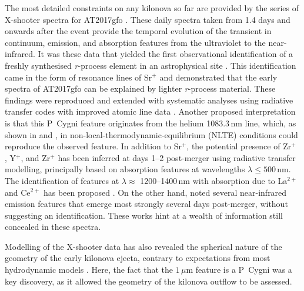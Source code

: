 \documentclass{aa}
\newcommand{\rproc}{\textit{r}-process\xspace}
\begin{document}
The most detailed constraints on any kilonova so far are provided by the series of X-shooter spectra for AT2017gfo \citep{Smartt2017,Pian2017}. These daily spectra taken from 1.4 days and onwards after the event provide the temporal evolution of the transient in continuum, emission, and absorption features from the ultraviolet to the near-infrared. It was these data that yielded the first observational identification of a freshly synthesised \rproc element in an astrophysical site \citep{Watson2019}. This identification came in the form of resonance lines of Sr\(^+\) and demonstrated that the early spectra of AT2017gfo can be explained by lighter \rproc material. These findings were reproduced and extended with systematic analyses using radiative transfer codes with improved atomic line data \citep{Domoto2021,Gillanders2022,Vieira2023}. Another proposed interpretation is that this P~Cygni feature originates from the helium 1083.3\,nm line, which, as shown in \citet{Perego2022} and \citet{Tarumi2023}, in non-local-thermodynamic-equilibrium (NLTE) conditions could reproduce the observed feature. In addition to Sr\(^+\), the potential presence of Zr\(^+\) \citep{Gillanders2022}, Y\(^+\), and Zr\(^+\) \citep{Vieira2023} has been inferred at days 1--2 post-merger using radiative transfer modelling, principally based on absorption features at wavelengths $\lambda \leq500$\,nm. The identification of features at $\lambda \approx$ 1200--1400\,nm with absorption due to La\(^{2+}\) and Ce\(^{2+}\) has been proposed \citep{Domoto2022}. On the other hand, \citet{Watson2019} noted several near-infrared emission features that emerge most strongly several days post-merger, without suggesting an identification. These works hint at a wealth of information still concealed in these spectra. 

Modelling of the X-shooter data has also revealed the spherical nature of the geometry of the early kilonova ejecta, contrary to expectations from most hydrodynamic models \citep{Sneppen2023}. Here, the fact that the $1\,\mu$m feature is a P~Cygni was a key discovery, as it allowed the geometry of the kilonova outflow to be assessed.%
  
\end{document}
